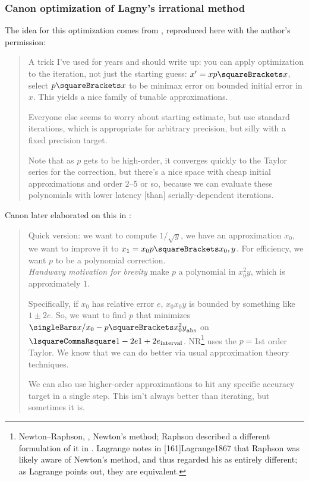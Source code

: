 ﻿\documentclass[10pt, a4paper, twoside]{basestyle}
\begin{document}
\subsubsection*{Canon optimization of Lagny's irrational method}
The idea for this optimization comes from \cite{Canon2018a}, reproduced here with the author’s permission:
\begin{quotation}
 A trick I’ve used for years and should write up: you can apply optimization to the iteration,
 not just the starting guess: $x' = x p\of x$, select $p\of x$ to be minimax error on bounded
 initial error in $x$. This yields a nice family of tunable approximations.

 Everyone else seems to worry about starting estimate, but use standard iterations,
 which is appropriate for arbitrary precision, but silly with a fixed precision target.

 Note that as $p$ gets to be high-order, it converges quickly to the Taylor series for the
 correction, but there's a nice space with cheap initial approximations and order $2$--$5$ or
 so, because we can evaluate these polynomials with lower latency [than] serially-dependent
 iterations.
\end{quotation}
Canon later elaborated on this in \cite{Canon2018b}:
\begin{quotation}
 Quick version: we want to compute $1/\sqrt{y}$, we have an approximation $x_0$, we want to
 improve it to $x_1 = x_0 p\of{x_0, y}$. For efficiency, we want $p$ to be a polynomial correction.\\
 \textit{Handwavy motivation for brevity} make $p$ a polynomial in $x_0^2y$, which is approximately $1$.

 Specifically, if $x_0$ has relative error $e$, $x_0x_0y$ is bounded by something like $1 \pm 2e$.
 So, we want to find $p$ that minimizes $\abs{x/x_0 - p\of{x_0^2y}}$ on $\intclos{1-2e}{1+2e}$.
 NR\footnote{Newton--Raphson, \idest, Newton's method; Raphson described a different formulation of it in \cite{Raphson1690}.
Lagrange notes in [161]{Lagrange1867} that Raphson was likely aware of Newton's method, and thus
regarded his as entirely different; as Lagrange points out, they are equivalent.}
uses the $p = 1$st order Taylor. We know that we can do better via usual approximation theory techniques.

 We can also use higher-order approximations to hit any specific accuracy target in a single step.
 This isn't always better than iterating, but sometimes it is.
\end{quotation}
\end{document}
